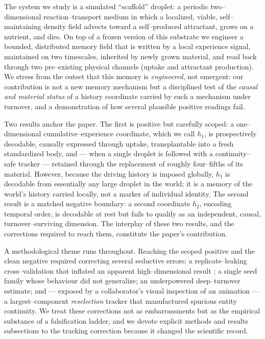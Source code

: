 \documentclass[11pt]{article}
\begin{document}
The system we study is a simulated ``scaffold'' droplet: a periodic two--dimensional reaction--transport medium in
which a localized, viable, self--maintaining density field advects toward a self--produced attractant, grows on a
nutrient, and dies. On top of a frozen version of this substrate we engineer a bounded, distributed memory field
that is written by a local experience signal, maintained on two timescales, inherited by newly grown material, and
read back through two pre--existing physical channels (uptake and attractant production). We stress from the outset
that this memory is \emph{engineered}, not emergent: our contribution is not a new memory mechanism but a
disciplined test of the \emph{causal and material status} of a history coordinate carried by such a mechanism under
turnover, and a demonstration of how several plausible positive readings fail.

Two results anchor the paper. The first is positive but carefully scoped: a one--dimensional cumulative--experience
coordinate, which we call $h_1$, is prospectively decodable, causally expressed through uptake, transplantable into
a fresh standardized body, and --- when a single droplet is followed with a continuity--safe tracker --- retained
through the replacement of roughly four--fifths of its material. However, because the driving history is imposed
globally, $h_1$ is decodable from essentially any large droplet in the world; it is a memory of the world's history
carried locally, not a marker of individual identity. The second result is a matched negative boundary: a second
coordinate $h_2$, encoding temporal order, is decodable at rest but fails to qualify as an independent, causal,
turnover--surviving dimension. The interplay of these two results, and the corrections required to reach them,
constitute the paper's contribution.

A methodological theme runs throughout. Reaching the scoped positive and the clean negative required correcting
several seductive errors: a replicate--leaking cross--validation that inflated an apparent high--dimensional
result \citep{kaufman2012}; a single seed family whose behaviour did not generalize; an underpowered deep--turnover
estimate; and --- exposed by a collaborator's visual inspection of an animation --- a largest--component
\emph{reselection} tracker that manufactured spurious entity continuity. We treat these corrections not as
embarrassments but as the empirical substance of a falsification ladder, and we devote explicit methods and results
subsections to the tracking correction because it changed the scientific record.
\end{document}
